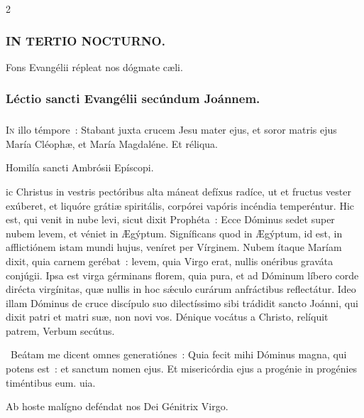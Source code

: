 \documentclass[9pt,twoside]{extarticle}
\begin{document}
\begin{multicols}{2}
{{\subsubsection*{\center \textsc{IN TERTIO NOCTURNO.}}
\begin{tightlist}{}
\item {\small {} Fons Evangélii répleat nos dógmate cæli.}
\end{tightlist}
\subsubsection*{\center Léctio sancti Evangélii secúndum Joánnem.}
\subsubsection*{\center {}}
\lettrine{I}n illo témpore~: Stabant juxta crucem Jesu mater ejus, et soror matris ejus María Cléophæ, et María Magdaléne. Et réliqua.

\begin{center}Homilía sancti Ambrósii Epíscopi.\\
\end{center}
ic Christus in vestris pectóribus alta máneat defíxus radíce, ut et fructus vester exúberet, et liquóre grátiæ spiritális, corpórei vapóris incéndia temperéntur. Hic est, qui venit in nube levi, sicut dixit Prophéta~: Ecce Dóminus sedet super nubem levem, et véniet in Ægýptum. Signíficans quod in Ægýptum, id est, in afflictiónem istam mundi hujus, veníret per Vírginem. Nubem ítaque Maríam dixit, quia carnem gerébat~: levem, quia Virgo erat, nullis onéribus graváta conjúgii. Ipsa est virga gérminans florem, quia pura, et ad Dóminum líbero corde dirécta virgínitas, quæ nullis in hoc sǽculo curárum anfráctibus reflectátur. Ideo illam Dóminus de cruce discípulo suo dilectíssimo sibi trádidit sancto Joánni, qui dixit patri et matri suæ, non novi vos. Dénique vocátus a Christo, relíquit patrem, Verbum secútus.

\begin{tightlist}{}
\item {}~Beátam me dicent omnes generatiónes~: \textred{*} Quia fecit mihi Dóminus magna, qui potens est~: et sanctum nomen ejus.
 Et misericórdia ejus a progénie in progénies timéntibus eum. uia.
\item {\small {} Ab hoste malígno deféndat nos Dei Génitrix Virgo.}
\end{tightlist}

}}
\end{multicols}
\end{document}
